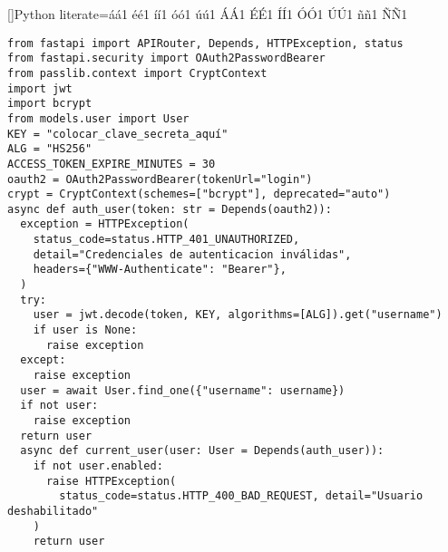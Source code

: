 []{Python}{
literate={á}{{\'a}}1 {é}{{\'e}}1 {í}{{\'i}}1 {ó}{{\'o}}1 {ú}{{\'u}}1
{Á}{{\'A}}1 {É}{{\'E}}1 {Í}{{\'I}}1 {Ó}{{\'O}}1 {Ú}{{\'U}}1
{ñ}{{\~n}}1 {Ñ}{{\~N}}1
}


\begin{lstlisting}[label=cod:vControl,caption=Pseudocódigo del control de acceso., language=PythonUTF8]
from fastapi import APIRouter, Depends, HTTPException, status
from fastapi.security import OAuth2PasswordBearer
from passlib.context import CryptContext
import jwt
import bcrypt
from models.user import User
KEY = "colocar_clave_secreta_aquí"
ALG = "HS256"
ACCESS_TOKEN_EXPIRE_MINUTES = 30
oauth2 = OAuth2PasswordBearer(tokenUrl="login")
crypt = CryptContext(schemes=["bcrypt"], deprecated="auto")
async def auth_user(token: str = Depends(oauth2)):
  exception = HTTPException(
    status_code=status.HTTP_401_UNAUTHORIZED,
    detail="Credenciales de autenticacion inválidas",
    headers={"WWW-Authenticate": "Bearer"},
  )
  try:
    user = jwt.decode(token, KEY, algorithms=[ALG]).get("username") 
    if user is None:
      raise exception   
  except:
    raise exception
  user = await User.find_one({"username": username})
  if not user:
    raise exception
  return user
  async def current_user(user: User = Depends(auth_user)):
    if not user.enabled:
      raise HTTPException(
        status_code=status.HTTP_400_BAD_REQUEST, detail="Usuario deshabilitado"
    )
    return user
\end{lstlisting}
